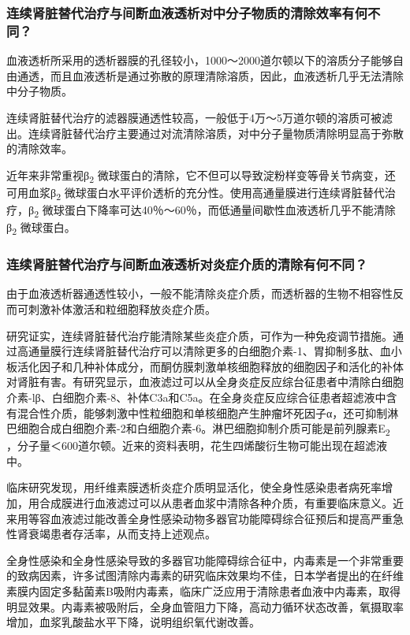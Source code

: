 \subsubsection{连续肾脏替代治疗与间断血液透析对中分子物质的清除效率有何不同？}

血液透析所采用的透析器膜的孔径较小，1000～2000道尔顿以下的溶质分子能够自由通透，而且血液透析是通过弥散的原理清除溶质，因此，血液透析几乎无法清除中分子物质。

连续肾脏替代治疗的滤器膜通透性较高，一般低于4万～5万道尔顿的溶质可被滤出。连续肾脏替代治疗主要通过对流清除溶质，对中分子量物质清除明显高于弥散的清除效率。

近年来非常重视β\textsubscript{2}
微球蛋白的清除，它不但可以导致淀粉样变等骨关节病变，还可用血浆β\textsubscript{2}
微球蛋白水平评价透析的充分性。使用高通量膜进行连续肾脏替代治疗，β\textsubscript{2}
微球蛋白下降率可达40％～60％，而低通量间歇性血液透析几乎不能清除β\textsubscript{2}
微球蛋白。

\subsubsection{连续肾脏替代治疗与间断血液透析对炎症介质的清除有何不同？}

由于血液透析器通透性较小，一般不能清除炎症介质，而透析器的生物不相容性反而可刺激补体激活和粒细胞释放炎症介质。

研究证实，连续肾脏替代治疗能清除某些炎症介质，可作为一种免疫调节措施。通过高通量膜行连续肾脏替代治疗可以清除更多的白细胞介素-1、胃抑制多肽、血小板活化因子和几种补体成分，而酮仿膜刺激单核细胞释放的细胞因子和活化的补体对肾脏有害。有研究显示，血液滤过可以从全身炎症反应综台征患者中清除白细胞介素-lβ、白细胞介素-8、补体C3a和C5a。在全身炎症反应综合征患者超滤液中含有混合性介质，能够刺激中性粒细胞和单核细胞产生肿瘤坏死因子α，还可抑制淋巴细胞合成白细胞介素-2和白细胞介素-6。淋巴细胞抑制介质可能是前列腺素E\textsubscript{2}
，分子量＜600道尔顿。近来的资料表明，花生四烯酸衍生物可能出现在超滤液中。

临床研究发现，用纤维素膜透析炎症介质明显活化，使全身性感染患者病死率增加，用合成膜进行血液滤过可以从患者血浆中清除各种介质，有重要临床意义。近来用等容血液滤过能改善全身性感染动物多器官功能障碍综合征预后和提高严重急性肾衰竭患者存活率，从而支持上述观点。

全身性感染和全身性感染导致的多器官功能障碍综合征中，内毒素是一个非常重要的致病因素，许多试图清除内毒素的研究临床效果均不佳，日本学者提出的在纤维素膜内固定多黏菌素B吸附内毒素，临床广泛应用于清除患者血液中内毒素，取得明显效果。内毒素被吸附后，全身血管阻力下降，高动力循环状态改善，氧摄取率增加，血浆乳酸盐水平下降，说明组织氧代谢改善。

